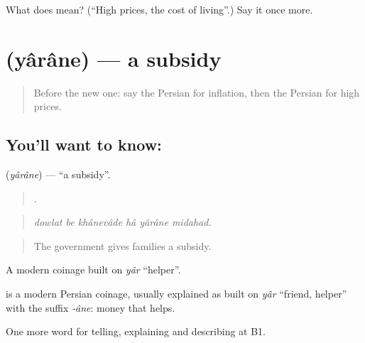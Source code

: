 \begin{tcolorbox}[breakable,colback=teal!4,colframe=teal!35!black,title={Before you move on}]
What does  mean? (\textquotedblleft{}High prices, the cost of living\textquotedblright{}.) Say it once more.
\end{tcolorbox}
\section[\texorpdfstring{\fa{یارانه} (yârâne)}{یارانه (yârâne)}]{ (yârâne) — a subsidy}

\label{lesson:FA-C413-yarane}



\begin{quote}
Before the new one: say the Persian for inflation, then the Persian for high prices.
\end{quote}

\subsection*{You'll want to know: }
\textbf{} (\emph{yârâne}) — \textquotedblleft{}a subsidy\textquotedblright{}.

\begin{quote}
     .
\end{quote}

\begin{quote}
\emph{dowlat be khânevâde hâ yârâne midahad.}
\end{quote}

\begin{quote}
The government gives families a subsidy.
\end{quote}

A modern coinage built on \emph{yâr} \textquotedblleft{}helper\textquotedblright{}.

\begin{cousinweb}
\textbf{} is a modern Persian coinage, usually explained as built on \emph{yâr} \textquotedblleft{}friend, helper\textquotedblright{} with the suffix \emph{-âne}: money that helps.
\end{cousinweb}

\begin{grammarlens}[title={What you've built}]
One more word for telling, explaining and describing at B1.
\end{grammarlens}

